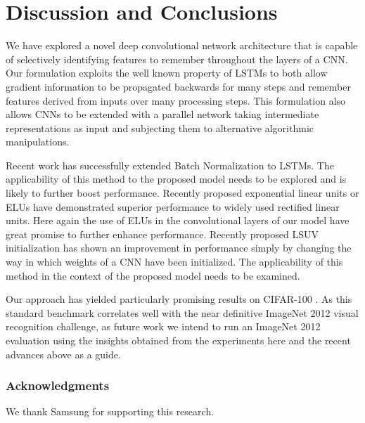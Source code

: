 \documentclass{article}
\begin{document}
\section{Discussion and Conclusions}

We have explored a novel deep convolutional network architecture that is capable of selectively identifying features to remember throughout the layers of a CNN. Our formulation exploits the well known property of LSTMs to both allow gradient information to be propagated backwards for many steps and remember features derived from inputs over many processing steps. This formulation also allows CNNs to be extended with a parallel network taking intermediate representations as input and subjecting them to alternative algorithmic manipulations.

Recent work \cite{DBLP:journals/corr/CooijmansBLC16} has successfully extended Batch Normalization to LSTMs. The applicability of this method to the proposed model needs to be explored and is likely to further boost performance.
Recently proposed exponential linear units or ELUs \cite{clevert2015fast} have demonstrated superior performance to widely used rectified linear units. Here again the use of ELUs in the convolutional layers of our model have great promise to further enhance performance.
Recently proposed LSUV initialization \cite{DBLP:journals/corr/MishkinM15} has shown an improvement in performance simply by changing the way in which weights of a CNN have been initialized. The applicability of this method in the context of the proposed model needs to be examined.

Our approach has yielded particularly promising results on CIFAR-100%
. As this standard benchmark correlates well with the near definitive ImageNet 2012 visual recognition challenge, as future work we intend to run an ImageNet 2012 evaluation using the insights obtained from the experiments here and the recent advances above as a guide.











\subsubsection*{Acknowledgments}
We thank Samsung for supporting this research.




\small


\medskip

\small
\end{document}
